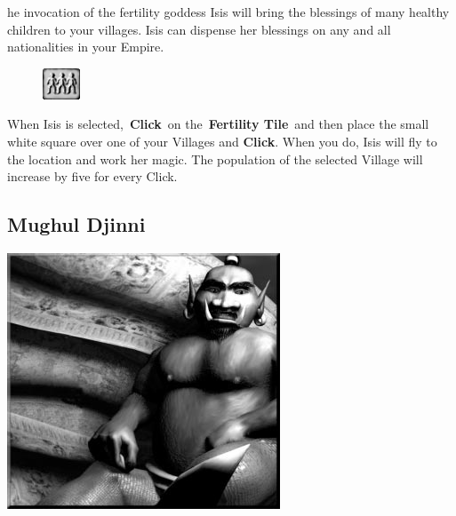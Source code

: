 he invocation of the fertility goddess Isis will bring the blessings of many healthy children to your villages. Isis can dispense her blessings on any and all nationalities in your Empire.

\begin{figure}
	\vspace{-20pt}
	\begin{center}
		\includegraphics[width=0.1\textwidth]{Tfertility}
	\end{center}
	\vspace{-20pt}
\end{figure}

When Isis is selected, \textbf{Click} on the \textbf{Fertility Tile} and then place the small white square over one of your Villages and \textbf{Click}. When you do, Isis will fly to the location and work her magic. The population of the selected Village will increase by five for every Click.

\subsection{Mughul Djinni}


\begin{center}
	\includegraphics[width=1\linewidth]{Adjinni}
\end{center}

